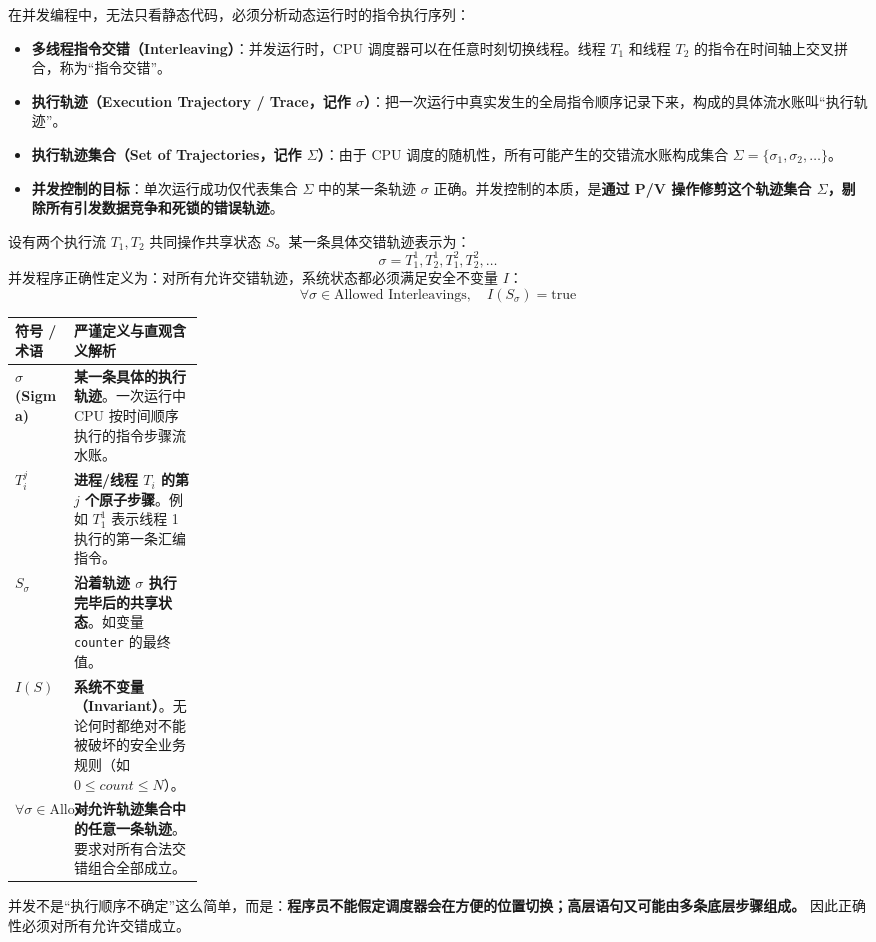 \documentclass[11pt,a4paper]{ctexart}
\newcommand{\kw}[1]{\textbf{#1}}
\newcommand{\code}[1]{\texttt{#1}}
\begin{document}
在并发编程中，无法只看静态代码，必须分析动态运行时的指令执行序列：
\begin{itemize}[leftmargin=1.5em]
\item \kw{多线程指令交错（Interleaving）}：并发运行时，CPU 调度器可以在任意时刻切换线程。线程 $T_1$ 和线程 $T_2$ 的指令在时间轴上交叉拼合，称为“指令交错”。
\item \kw{执行轨迹（Execution Trajectory / Trace，记作 $\sigma$）}：把一次运行中真实发生的全局指令顺序记录下来，构成的具体流水账叫“执行轨迹”。
\item \kw{执行轨迹集合（Set of Trajectories，记作 $\Sigma$）}：由于 CPU 调度的随机性，所有可能产生的交错流水账构成集合 $\Sigma = \{\sigma_1, \sigma_2, \ldots\}$。
\item \kw{并发控制的目标}：单次运行成功仅代表集合 $\Sigma$ 中的某一条轨迹 $\sigma$ 正确。并发控制的本质，是\kw{通过 P/V 操作修剪这个轨迹集合 $\Sigma$，剔除所有引发数据竞争和死锁的错误轨迹}。
\end{itemize}

设有两个执行流 $T_1,T_2$ 共同操作共享状态 $S$。某一条具体交错轨迹表示为：
\[
\sigma=T_1^1,T_2^1,T_1^2,T_2^2,\ldots
\]
并发程序正确性定义为：对所有允许交错轨迹，系统状态都必须满足安全不变量 $I$：
\[
\boxed{\forall\sigma\in\text{Allowed Interleavings},\quad I(S_\sigma)=\mathrm{true}}
\]

\begingroup
\small
\renewcommand{\arraystretch}{1.25}
\begin{tabularx}{\linewidth}{>{\bfseries}p{0.22\linewidth} X}
\toprule
符号 / 术语 & 严谨定义与直观含义解析 \\
\midrule
$\sigma$ (Sigma) & \kw{某一条具体的执行轨迹}。一次运行中 CPU 按时间顺序执行的指令步骤流水账。 \\
$T_i^j$ & \kw{进程/线程 $T_i$ 的第 $j$ 个原子步骤}。例如 $T_1^1$ 表示线程 1 执行的第一条汇编指令。 \\
$S_\sigma$ & \kw{沿着轨迹 $\sigma$ 执行完毕后的共享状态}。如变量 \code{counter} 的最终值。 \\
$I(S)$ & \kw{系统不变量（Invariant）}。无论何时都绝对不能被破坏的安全业务规则（如 $0 \le count \le N$）。 \\
$\forall\sigma \in \text{Allowed Interleavings}$ & \kw{对允许轨迹集合中的任意一条轨迹}。要求对所有合法交错组合全部成立。 \\
\bottomrule
\end{tabularx}
\endgroup

\begin{corebox}[并发篇第一原则]
并发不是“执行顺序不确定”这么简单，而是：\kw{程序员不能假定调度器会在方便的位置切换；高层语句又可能由多条底层步骤组成。} 因此正确性必须对所有允许交错成立。
\end{corebox}
\end{document}
